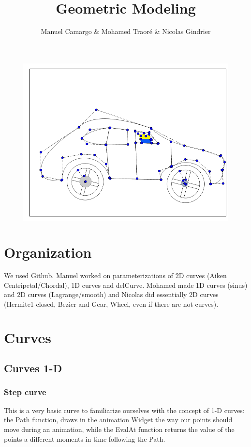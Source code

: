 \documentclass{article}
\title{Geometric Modeling}
\author{Manuel Camargo & Mohamed Traoré &  Nicolas Gindrier}
\date{}
\begin{document}
\maketitle
\begin{figure}[H]
	\center
   \includegraphics[scale = 0.5]{Pictures/narutovoiture.png}
\end{figure}
\section*{Organization}
We used Github. Manuel worked on parameterizations of 2D curves (Aiken Centripetal/Chordal), 1D curves and delCurve. Mohamed made 1D curves (sinus) and 2D curves (Lagrange/smooth) and Nicolas did essentially 2D curves (Hermite1-closed, Bezier and Gear, Wheel, even if there are not curves). 
\section*{Curves}
\subsection*{Curves 1-D}
\subsubsection*{Step curve}

This is a very basic curve to familiarize ourselves with the concept of 1-D curves: the Path function, draws in the animation Widget the way our points should move during an animation, while the EvalAt function returns the value of the points a different moments in time following the Path.
\end{document}

